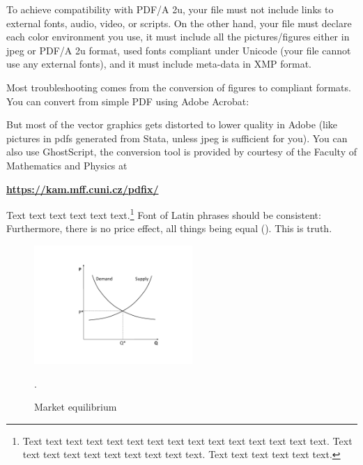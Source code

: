 To achieve compatibility with PDF/A 2u, your file must not include links to external fonts, audio, video, or scripts. On the other hand, your file must declare each color environment you use, it must include all the pictures/figures either in jpeg or PDF/A 2u format, used fonts compliant under Unicode (your file cannot use any external fonts), and it must include meta-data in XMP format.


Most troubleshooting comes from the conversion of figures to compliant formats. You can convert from simple PDF using Adobe Acrobat:



But most of the vector graphics gets distorted to lower quality in Adobe (like pictures in pdfs generated from Stata, unless jpeg is sufficient for you). You can also use GhostScript, the conversion tool is provided by courtesy of the Faculty of Mathematics and Physics at

\vspace{0.5cm}
\textbf{\href{https://kam.mff.cuni.cz/pdfix/}{https://kam.mff.cuni.cz/pdfix/}}
\vspace{0.5cm}

Text text text text text text.\footnote{Text text text text text text text text text text text text text text text. Text text text text text text text text text text. Text text text text text text.} Font of Latin phrases should be consistent: Furthermore, there is no  price effect, all things being equal (). This is  truth.

\begin{figure}[!htbp]
\begin{center}
\caption{Market equilibrium}
\label{fig:supply}
\includegraphics[width=60mm]{Figures/supplydemand}
\end{center}\vspace{-0.5cm}
\begin{source}\cite{Haufler2006}.\end{source}
\end{figure}

